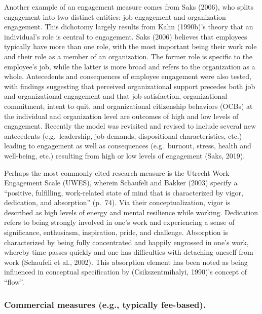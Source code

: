 \documentclass[
  man]{apa6}
\begin{document}
Another example of an engagement measure comes from Saks (2006), who splits engagement into two distinct entities: job engagement and organization engagement. This dichotomy largely results from Kahn (1990b)'s theory that an individual's role is central to engagement. Saks (2006) believes that employees typically have more than one role, with the most important being their work role and their role as a member of an organization. The former role is specific to the employee's job, while the latter is more broad and refers to the organization as a whole. Antecedents and consequences of employee engagement were also tested, with findings suggesting that perceived organizational support precedes both job and organizational engagement and that job satisfaction, organizational commitment, intent to quit, and organizational citizenship behaviors (OCBs) at the individual and organization level are outcomes of high and low levels of engagement. Recently the model was revisited and revised to include several new antecedents (e.g.~leadership, job demands, dispositional characteristics, etc.) leading to engagement as well as consequences (e.g.~burnout, stress, health and well-being, etc.) resulting from high or low levels of engagement (Saks, 2019).

Perhaps the most commonly cited research measure is the Utrecht Work Engagement Scale (UWES), wherein Schaufeli and Bakker (2003) specify a ``positive, fulfilling, work-related state of mind that is characterized by vigor, dedication, and absorption'' (p.~74). Via their conceptualization, vigor is described as high levels of energy and mental resilience while working. Dedication refers to being strongly involved in one's work and experiencing a sense of significance, enthusiasm, inspiration, pride, and challenge. Absorption is characterized by being fully concentrated and happily engrossed in one's work, whereby time passes quickly and one has difficulties with detaching oneself from work (Schaufeli et al., 2002). This absorption element has been noted as being influenced in conceptual specification by (Csikszentmihalyi, 1990)'s concept of ``flow''.

\hypertarget{commercial-measures-e.g.-typically-fee-based.}{%
\subsubsection{Commercial measures (e.g., typically fee-based).}\label{commercial-measures-e.g.-typically-fee-based.}}
\end{document}
